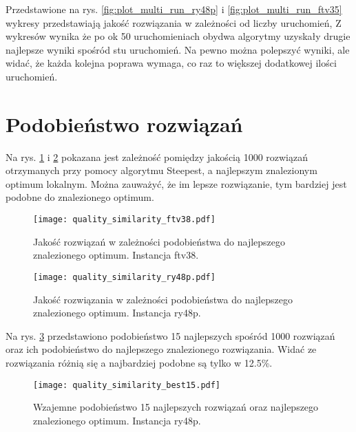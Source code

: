 \documentclass{article}
\begin{document}
Przedstawione na rys. \ref{fig:plot_multi_run_ry48p} i \ref{fig:plot_multi_run_ftv35}  wykresy przedstawiają jakość rozwiązania w zależności od liczby uruchomień, Z wykresów wynika że po ok 50 uruchomieniach obydwa algorytmy uzyskały drugie najlepsze wyniki spośród stu uruchomień. Na pewno można polepszyć wyniki, ale widać, że każda kolejna poprawa wymaga, co raz to większej dodatkowej ilości uruchomień. 

\section{Podobieństwo rozwiązań}

Na rys. \ref{fig:quality_sim_ftv38} i \ref{fig:quality_sim_ry48p} pokazana jest zależność pomiędzy jakością 1000 rozwiązań otrzymanych przy pomocy algorytmu Steepest, a najlepszym znalezionym optimum lokalnym. Można zauważyć, że im lepsze rozwiązanie, tym bardziej jest podobne do znalezionego optimum.

\begin{figure}[H]
    \begin{center}
        \texttt{[image: quality\_similarity\_ftv38.pdf]}
    \end{center}
    \caption{Jakość rozwiązań w zależności podobieństwa do najlepszego znalezionego optimum. Instancja ftv38.}
    \label{fig:quality_sim_ftv38}
\end{figure}

\begin{figure}[H]
    \begin{center}
        \texttt{[image: quality\_similarity\_ry48p.pdf]}
    \end{center}
    \caption{Jakość rozwiązania w zależności podobieństwa do najlepszego znalezionego optimum. Instancja ry48p.}
    \label{fig:quality_sim_ry48p}
\end{figure}


Na rys. \ref{fig:quality_sim} przedstawiono podobieństwo 15 najlepszych spośród 1000 rozwiązań oraz ich podobieństwo do najlepszego znalezionego rozwiązania. Widać ze rozwiązania różnią się a najbardziej podobne są tylko w 12.5\%.


\begin{figure}[H]
    \begin{center}
        \texttt{[image: quality\_similarity\_best15.pdf]}
    \end{center}
    \caption{Wzajemne podobieństwo 15 najlepszych rozwiązań oraz najlepszego znalezionego optimum. Instancja ry48p.}
    \label{fig:quality_sim}
\end{figure}
\end{document}
